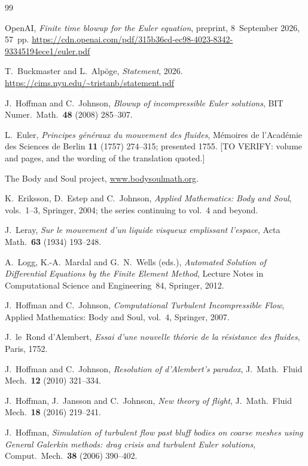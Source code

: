 \documentclass[11pt]{article}
\begin{document}
\begin{thebibliography}{99}

 OpenAI, \emph{Finite time blowup for the Euler equation}, preprint,
8~September 2026,
57~pp.
\newblock \url{https://cdn.openai.com/pdf/315b36cd-ec98-4023-8342-93345194ece1/euler.pdf}

 T.~Buckmaster and L.~Alp\"oge, \emph{Statement}, 2026.
\newblock \url{https://cims.nyu.edu/~tristanb/statement.pdf}

 J.~Hoffman and C.~Johnson, \emph{Blowup of incompressible Euler solutions},
BIT Numer.\ Math.\ \textbf{48} (2008) 285--307.

 L.~Euler, \emph{Principes g\'en\'eraux du mouvement des fluides},
M\'emoires de l'Acad\'emie des Sciences de Berlin \textbf{11} (1757) 274--315; presented 1755.
[TO VERIFY: volume and pages, and the wording of the translation quoted.]

 The Body and Soul project, \url{www.bodysoulmath.org}.

 K.~Eriksson, D.~Estep and C.~Johnson, \emph{Applied Mathematics: Body and Soul},
vols.~1--3, Springer, 2004; the series continuing to vol.~4 and beyond.

 J.~Leray, \emph{Sur le mouvement d'un liquide visqueux emplissant l'espace},
Acta Math.\ \textbf{63} (1934) 193--248.

 A.~Logg, K.-A.~Mardal and G.~N.~Wells (eds.), \emph{Automated Solution of
Differential Equations by the Finite Element Method}, Lecture Notes in Computational Science and
Engineering~84, Springer, 2012.

 J.~Hoffman and C.~Johnson, \emph{Computational Turbulent Incompressible Flow},
Applied Mathematics: Body and Soul, vol.~4, Springer, 2007.

 J.~le~Rond d'Alembert, \emph{Essai d'une nouvelle th\'eorie de la
r\'esistance des fluides}, Paris, 1752.

 J.~Hoffman and C.~Johnson, \emph{Resolution of d'Alembert's paradox},
J.\ Math.\ Fluid Mech.\ \textbf{12} (2010) 321--334.

 J.~Hoffman, J.~Jansson and C.~Johnson, \emph{New theory of flight},
J.\ Math.\ Fluid Mech.\ \textbf{18} (2016) 219--241.

 J.~Hoffman, \emph{Simulation of turbulent flow past bluff bodies on coarse
meshes using General Galerkin methods: drag crisis and turbulent Euler solutions}, Comput.\ Mech.\
\textbf{38} (2006) 390--402.


\end{thebibliography}
\end{document}
